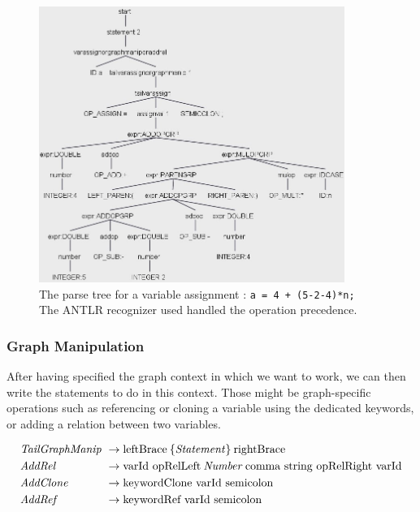 \begin{figure}[H]
    \centering
    \includegraphics[height = 9cm]{figures/parse_trees/parseTree_varAssign}
    \caption{The parse tree for a variable assignment :  \texttt{a = 4 + (5-2-4)*n;} \\The ANTLR recognizer used handled the operation precedence.}
    \label{fig:parseTree_varAssign}
\end{figure}

\subsubsection*{Graph Manipulation}

After having specified the graph context in which we want to work, we can then write the statements to do in this context.
Those might be graph-specific operations such as referencing or cloning a variable using the dedicated keywords, or adding a relation between two variables.

\begin{align*}
    \omit $\mathit{TailGraphManip}$ \hfil &\rightarrow \text{leftBrace} \: \{ \mathit{Statement} \}  \: \text{rightBrace} \\
    \omit $\mathit{AddRel}$ \hfil & \rightarrow \text{varId opRelLeft} \: \mathit{Number} \: \text{comma string opRelRight varId} \\
    \omit $\mathit{AddClone}$ \hfil & \rightarrow \text{keywordClone varId semicolon} \\
    \omit $\mathit{AddRef}$ \hfil & \rightarrow \text{keywordRef varId semicolon}
\end{align*}

